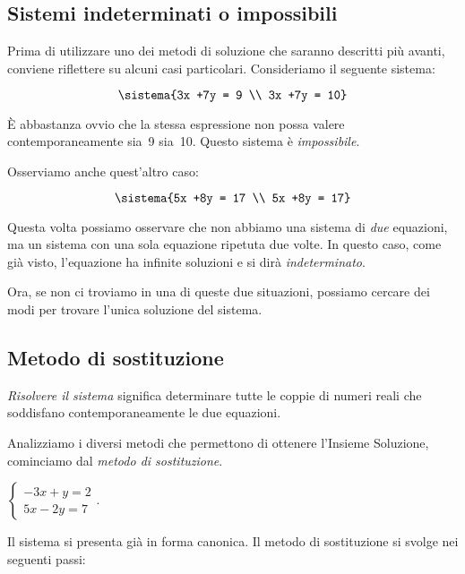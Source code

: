 \subsection{Sistemi indeterminati o impossibili}

Prima di utilizzare uno dei metodi di soluzione che saranno descritti più 
avanti, conviene riflettere su alcuni casi particolari. Consideriamo il 
seguente sistema:

\[\sistema{3x +7y = 9 \\ 3x +7y = 10}\]

È abbastanza ovvio che la stessa espressione non possa valere 
contemporaneamente sia~9 sia~10. Questo sistema è \emph{impossibile}.

Osserviamo anche quest'altro caso:

\[\sistema{5x +8y = 17 \\ 5x +8y = 17}\]

Questa volta possiamo osservare che non abbiamo una sistema di \emph{due} 
equazioni, ma un sistema con una sola equazione ripetuta due volte. In questo 
caso, come già visto, l'equazione ha infinite soluzioni e si dirà 
\emph{indeterminato}.

Ora, se non ci troviamo in una di queste due situazioni, possiamo cercare dei 
modi per trovare l'unica soluzione del sistema.

\subsection{Metodo di sostituzione}
\emph{Risolvere il sistema} significa determinare tutte le coppie di
numeri reali che soddisfano contemporaneamente le due equazioni.

Analizziamo i diversi metodi che permettono di ottenere
l'Insieme Soluzione, cominciamo dal \emph{metodo di sostituzione}.

\begin{esempio}
$\left\{\begin{array}{l}-3x+y=2\\5x-2y=7\end{array}\right.$.
\end{esempio}

Il sistema si presenta già in forma canonica. Il metodo di
sostituzione si svolge nei seguenti passi:

